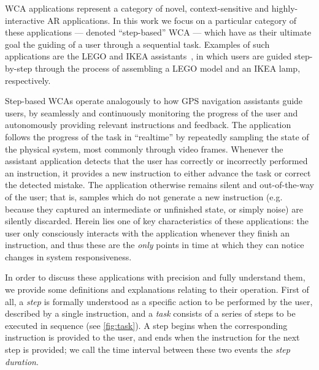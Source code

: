 \acf{WCA} applications represent a category of novel, context-sensitive and highly-interactive \ac{AR} applications.
In this work we focus on a particular category of these applications --- denoted ``step-based'' \ac{WCA} --- which have as their ultimate goal the guiding of a user through a sequential task.
Examples of such applications are the LEGO and IKEA assistants~\cite{Chen2015LEGO,Chen2018application}, in which users are guided step-by-step through the process of assembling a LEGO model and an IKEA lamp, respectively.

Step-based \acp{WCA} operate analogously to how \ac{GPS} navigation assistants guide users, by seamlessly and continuously monitoring the progress of the user and autonomously providing relevant instructions and feedback.
The application follows the progress of the task in ``realtime'' by repeatedly sampling the state of the physical system, most commonly through video frames.
Whenever the assistant application detects that the user has correctly or incorrectly performed an instruction, it provides a new instruction to either advance the task or correct the detected mistake.
The application otherwise remains silent and out-of-the-way of the user; that is, samples which do not generate a new instruction (e.g. because they captured an intermediate or unfinished state, or simply noise) are silently discarded.
Herein lies one of key characteristics of these applications: the user only consciously interacts with the application whenever they finish an instruction, and thus these are the \emph{only} points in time at which they can notice changes in system responsiveness.

In order to discuss these applications with precision and fully understand them, we provide some definitions and explanations relating to their operation.
First of all, a \emph{step} is formally understood as a specific action to be performed by the user, described by a single instruction, and a \emph{task} consists of a series of steps to be executed in sequence (see \cref{fig:task}).
A step begins when the corresponding instruction is provided to the user, and ends when the instruction for the next step is provided; we call the time interval between these two events the \emph{step duration}.

